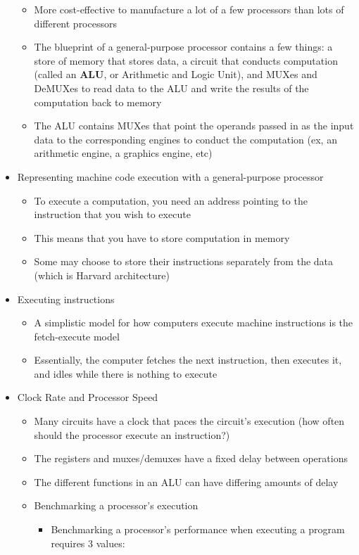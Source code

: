 \documentclass{article}
\begin{document}
\begin{itemize}
\begin{itemize}
			\item More cost-effective to manufacture a lot of a few processors than lots of different processors
			\item The blueprint of a general-purpose processor contains a few things: a store of memory that stores data, a circuit that conducts computation (called an \textbf{ALU}, or Arithmetic and Logic Unit), and MUXes and DeMUXes to read data to the ALU and write the results of the computation back to memory
			\item The ALU contains MUXes that point the operands passed in as the input data to the corresponding engines to conduct the computation (ex, an arithmetic engine, a graphics engine, etc)
		\end{itemize}
	\item Representing machine code execution with a general-purpose processor
		\begin{itemize}
			\item To execute a computation, you need an address pointing to the instruction that you wish to execute
			\item This means that you have to store computation in memory
			\item Some may choose to store their instructions separately from the data (which is Harvard architecture)
		\end{itemize}
	\item Executing instructions
		\begin{itemize}
			\item A simplistic model for how computers execute machine instructions is the fetch-execute model
			\item Essentially, the computer fetches the next instruction, then executes it, and idles while there is nothing to execute
		\end{itemize}
	\item Clock Rate and Processor Speed
		\begin{itemize}
			\item Many circuits have a clock that paces the circuit's execution (how often should the processor execute an instruction?)
			\item The registers and muxes/demuxes have a fixed delay between operations
			\item The different functions in an ALU can have differing amounts of delay
			\item Benchmarking a processor's execution
				\begin{itemize}
					\item Benchmarking a processor's performance when executing a program requires 3 values:

\end{itemize}
\end{itemize}
\end{itemize}
\end{document}
